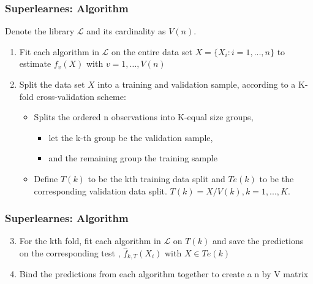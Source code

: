\documentclass[
  shownotes,
  xcolor={svgnames},
  hyperref={colorlinks,citecolor=DarkBlue,linkcolor=DarkRed,urlcolor=DarkBlue}
  , aspectratio=169]{beamer}
\begin{document}
\begin{frame}[fragile]
\frametitle{Superlearnes: Algorithm}
Denote the library $\mathcal{L}$ and its cardinality as $V(n)$.

\medskip 
 \begin{enumerate}
 \item Fit each algorithm in $\mathcal{L}$ on the entire data set $X = \{X_i : i = 1,...,n\}$ to estimate $f_v(X)$ with $v=1,\dots,V(n)$
 \medskip
 \item  Split the data set $X$ into a training and validation sample, according to a K-fold cross-validation scheme: 
 \medskip
\begin{itemize}
  \item Splits the ordered n observations into K-equal size groups, 
  \begin{itemize}
  \item let the k-th group be the validation sample, 
  \item and the remaining group the training sample
  \end{itemize}
  \item  Define $T(k)$ to be the kth training data split and $Te(k)$ to be the corresponding validation data split. $T(k)=X\slash V(k),k=1,...,K.$
\end{itemize}
  
 \end{enumerate}

\end{frame}
\begin{frame}[fragile]
\frametitle{Superlearnes: Algorithm}


 
 \begin{enumerate}
 \setcounter{enumi}{2}
 \item For the kth fold, fit each algorithm in $\mathcal{L}$  on $T(k)$ and save the predictions on the corresponding test , $\hat{f}_{k,T}(X_i)$ with $X\in Te(k)$
 \medskip
 \item Bind the predictions from each algorithm together to create a n by V matrix
\end{enumerate}

\end{frame}
\end{document}
